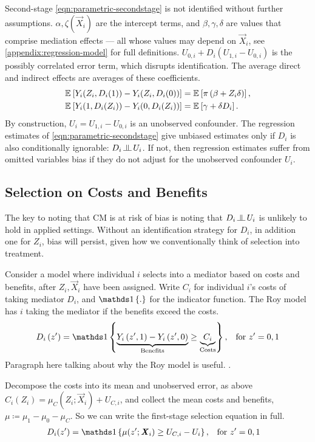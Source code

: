 Second-stage \eqref{eqn:parametric-secondstage} is not identified without further assumptions.
$\alpha, \zeta(\vec X_i)$ are the intercept terms, and $\beta, \gamma, \delta$ are values that comprise mediation effects --- all whose values may depend on $\vec X_i$, see \autoref{appendix:regression-model} for full definitions.
$U_{0,i} + D_i \left( U_{1,i} - U_{0,i} \right)$ is the possibly correlated error term, which disrupts identification.
The average direct and indirect effects are averages of these coefficients.
\begin{align*}
    \mathbb{E}_{} \left[ Y_i(Z_i, D_i(1)) - Y_i(Z_i, D_i(0)) \right]
        &= \mathbb{E}_{} \left[ \pi \left( \beta +  Z_i \delta \right) \right], \\
    \mathbb{E}_{} \left[ Y_i(1, D_i(Z_i)) - Y_i(0, D_i(Z_i)) \right]
        &= \mathbb{E}_{} \left[ \gamma + \delta D_i \right].
\end{align*}
By construction, $U_i = U_{1, i} - U_{0, i}$ is an unobserved confounder.
The regression estimates of \autoref{eqn:parametric-secondstage} give unbiased estimates only if $D_i$ is also conditionally ignorable: $D_i \indep  U_i$.
If not, then regression estimates suffer from omitted variables bias if they do not adjust for the unobserved confounder $U_i$.

\subsection{Selection on Costs and Benefits}
The key to noting that CM is at risk of bias is noting that $D_i \indep  U_i$ is unlikely to hold in applied settings.
Without an identification strategy for $D_i$, in addition one for $Z_i$, bias will persist, given how we conventionally think of selection into treatment.

Consider a model where individual $i$ selects into a mediator based on costs and benefits, after $Z_i, \vec X_i$ have been assigned.
Write $C_i$ for individual $i$'s costs of taking mediator $D_i$, and $\indicator{.}$ for the indicator function.
The Roy model has $i$ taking the mediator if the benefits exceed the costs.
\[ D_i \left( z' \right) = \indicator{
    \underbrace{Y_i\left( z', 1 \right) - Y_i\left( z', 0 \right)}_{\text{Benefits}}
    \geq \underbrace{C_i}_{\text{Costs}}}, \;\;\; \text{for } z'=0,1 \]
Paragraph here talking about why the Roy model is useful.
\citep{roy1951some,heckman1990empirical}.

Decompose the costs into its mean and unobserved error, as above $C_i(Z_i) = \mu_{C}(Z_i; \vec X_i) + U_{C,i}$, and collect the mean costs and benefits, $\mu \coloneqq \mu_1 - \mu_0 - \mu_C$.
So we can write the first-stage selection equation in full.
\begin{align*}
    D_i(z') &= \indicator{
        \mu(z'; \vec X_i) \geq U_{C,i} - U_i }
        , \;\;\; \text{for } z'=0,1
\end{align*}

